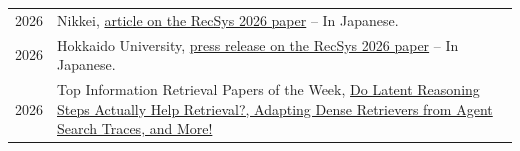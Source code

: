 %
%
\begin{longtable}[l]{@{}p{} p{}}

    2026 & Nikkei, \href{https://www.nikkei.com/article/DGXZQOSG161Y30W6A011C2000000/}{article on the RecSys 2026 paper} -- In Japanese. \\

    2026 & Hokkaido University, \href{https://www.hokudai.ac.jp/news/2026/10/ai-14.html}{press release on the RecSys 2026 paper} -- In Japanese. \\

    2026 & Top Information Retrieval Papers of the Week, \href{https://recsys.substack.com/p/do-latent-reasoning-steps-actually}{Do Latent Reasoning Steps Actually Help Retrieval?, Adapting Dense Retrievers from Agent Search Traces, and More!} \\

\end{longtable}
